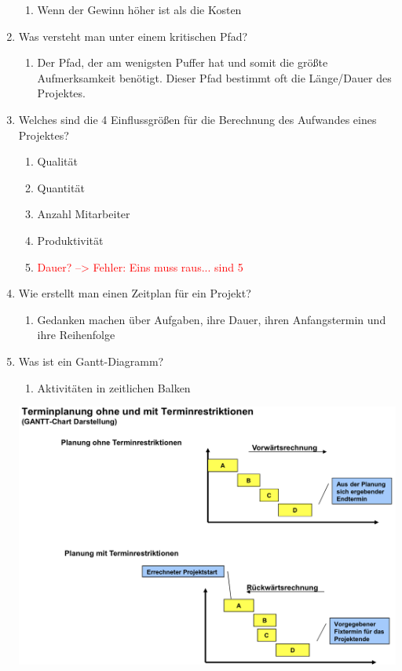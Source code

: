 \documentclass[12pt,a4paper]{article}
\begin{document}
\begin{enumerate}
	\begin{enumerate}
		\item Wenn der Gewinn höher ist als die Kosten
	\end{enumerate}
	\item Was versteht man unter einem kritischen Pfad?
	\begin{enumerate}
		\item Der Pfad, der am wenigsten Puffer hat und somit die größte Aufmerksamkeit benötigt. Dieser Pfad bestimmt oft die Länge/Dauer des Projektes.
	\end{enumerate}
	\item Welches sind die 4 Einflussgrößen für die Berechnung des Aufwandes eines Projektes?
	\begin{enumerate}
		\item Qualität
		\item Quantität
		\item Anzahl Mitarbeiter
		\item Produktivität
		\item \textcolor{red}{Dauer? --> Fehler: Eins muss raus... sind 5}
	\end{enumerate}
	\item Wie erstellt man einen Zeitplan für ein Projekt?
	\begin{enumerate}
		\item Gedanken machen über Aufgaben, ihre Dauer, ihren Anfangstermin und ihre Reihenfolge
	\end{enumerate}
	\newpage
	\item Was ist ein Gantt-Diagramm?
	\begin{enumerate}
		\item Aktivitäten in zeitlichen Balken
	\end{enumerate}
	\begin{center}
		\includegraphics[scale=.175]{Bilder/Gantt.JPG}	

\end{center}
\end{enumerate}
\end{document}
